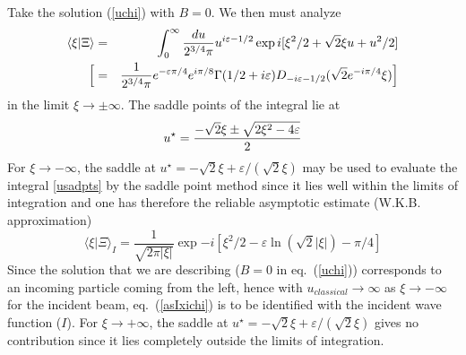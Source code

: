 \documentclass[12pt,oneside]{report}
\begin{document}
\par Take the solution (\ref{uchi}) with $B=0$.  We 
then must analyze
\begin{eqnarray} \langle \xi |  \Xi  \rangle &=& 
\int^\infty_0 {du \over 2^{3/4}\pi} 
u^{i\varepsilon-1/2}\exp i [\xi^2/2+\sqrt{2}\xi u+u^2/2 ] \label{xichiu}\\
\Bigl[&=&\frac{1}{2^{3/4}\pi}e^{-\varepsilon \pi /4}e^{i\pi/8}\Gamma
(1/2+i\varepsilon) D_{-i\varepsilon -1/2}(\sqrt{2}e^{-i\pi/4}\xi)\Bigr]\nonumber
\end{eqnarray} in the limit $\xi \to \pm \infty $.  The saddle points of the
integral lie at 
\begin{eqnarray}
u^{\star}= {-\sqrt{2}\xi \pm \sqrt{2\xi^2-4\varepsilon}\over 2} \label{usadpts}
\end{eqnarray}
For $\xi \to -\infty $, the saddle at $u^{\star}= - \sqrt{2} \xi + 
\varepsilon/(\sqrt{2}\xi)$
may be used to evaluate the integral \ref{usadpts} by the saddle point method since it lies well within
the limits of integration and one has therefore the reliable asymptotic 
estimate (W.K.B.
approximation) 
\begin{equation}
\langle \xi |  \Xi  \rangle_I =\frac{1}{\sqrt{2 \pi|\xi |}}
\exp {-i\left[\xi^2/2 -\varepsilon \ln(\sqrt{2}|\xi|)-\pi/4\right]}\label{asIxichi}
\end{equation}
Since the solution that we are describing ($B=0$ in eq.~(\ref{uchi}))
corresponds
 to an incoming particle coming from the left, hence with $u_{classical}\to 
\infty $ 
as $\xi \to - \infty $ for the incident beam, eq.~(\ref{asIxichi})
is to be identified with the incident wave function ($I$).
For $\xi \to + \infty $, the saddle at $u^{\star}=  - \sqrt{2} \xi + 
\varepsilon/(\sqrt{2}\xi)$
gives no contribution since it lies completely 
outside the limits of integration.
\end{document}
